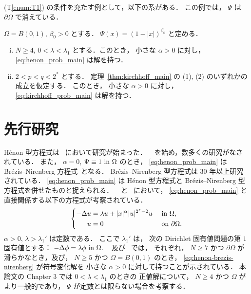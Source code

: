(T\ref{enum:T1}) の条件を充たす例として，以下の系がある．
この例では， $\Psi$ は $\partial \Omega$ で消えている．

\begin{cor}[Corollary~1.1.3] \label{cor:cor_of_main_theorem}
  $\Omega = B(0, 1)$, $\beta_0 > 0$ とする．
  $\Psi(x) = \left(1 - \lvert x \rvert \right)^{\beta_0}$ と定める．
  \begin{enumerate}[(i)]
    \item
      $N \geq 4$, $0 < \lambda < \lambda_1$ とする．このとき，
      小さな $\alpha > 0$ に対し， \eqref{eq:henon_prob_main} は解を持つ．
    \item
      $2 < p < q < 2^*$ とする．
      定理~\ref{thm:kirchhoff_main} の (1), (2) のいずれかの成立を仮定する．
      このとき，
      小さな $\alpha > 0$ に対し， \eqref{eq:kirchhoff_prob_main} は解を持つ．
  \end{enumerate}
\end{cor}

\section{先行研究}

Hénon 型方程式は~\cite{henon1973numerical} において研究が始まった．
~\cite{MR674869} を始め，数多くの研究がなされている．
また， $\alpha = 0$, $\Psi \equiv 1 \text{ in } \Omega$ のとき，
\eqref{eq:henon_prob_main} は Brézis--Nirenberg
方程式~\cite{MR709644}となる．
Brézis--Nirenberg 型方程式は $30$ 年以上研究されている．
\eqref{eq:henon_prob_main} は Hénon 型方程式と
Brézis--Nirenberg 型方程式を併せたものと捉えられる．
~\cite{MR2951742} と~\cite{MR2951722} において，
\eqref{eq:henon_prob_main} と直接関係する以下の方程式が考察されている．
\begin{align}
  \left\{
  \begin{aligned}
    - \Delta u       & = \lambda u + \lvert x \rvert^\alpha \lvert u
    \rvert^{2^*-2} u &                                               & \text{ in } \Omega,                         \\
    u                & = 0                                           &              & \text{ on } \partial \Omega.
  \end{aligned}
  \right. \label{eq:henon-brezis-nirenberg}
\end{align}
$\alpha > 0$, $\lambda > \lambda_1'$ は定数である．
ここで $\lambda_1'$ は，
次の Dirichlet 固有値問題の第 $1$ 固有値とする：
$-\Delta \phi = \lambda \phi \text{ in } \Omega$.
~\cite{MR2951742} 及び~\cite{MR2951722} では，
それぞれ，
$N \geq 7$ かつ $\partial\Omega$ が滑らかなとき，及び，
$N \geq 5$ かつ $\Omega = B(0, 1)$ のとき，
\eqref{eq:henon-brezis-nirenberg} が符号変化解を
小さな $\alpha > 0$ に対して持つことが示されている．
本論文の Chapter 3 では $0 < \lambda < \lambda_1$ のときの
正値解について， $N \geq 4$ かつ $\Omega$ がより一般的であり，
$\Psi$ が定数とは限らない場合を考察する．

